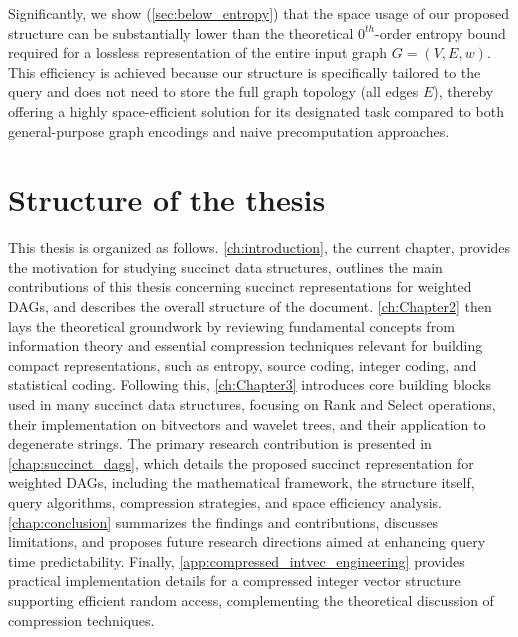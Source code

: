 Significantly, we show (\autoref{sec:below_entropy}) that the space usage of our proposed structure can be substantially lower than the theoretical $0^{th}$-order entropy bound required for a lossless representation of the entire input graph $G=(V, E, w)$. This efficiency is achieved because our structure is specifically tailored to the \Rank{} query and does not need to store the full graph topology (all edges $E$), thereby offering a highly space-efficient solution for its designated task compared to both general-purpose graph encodings and naive precomputation approaches.

\section{Structure of the thesis}
\label{sec:structure}

This thesis is organized as follows. \autoref{ch:introduction}, the current chapter, provides the motivation for studying succinct data structures, outlines the main contributions of this thesis concerning succinct representations for weighted DAGs, and describes the overall structure of the document. \autoref{ch:Chapter2} then lays the theoretical groundwork by reviewing fundamental concepts from information theory and essential compression techniques relevant for building compact representations, such as entropy, source coding, integer coding, and statistical coding. Following this, \autoref{ch:Chapter3} introduces core building blocks used in many succinct data structures, focusing on Rank and Select operations, their implementation on bitvectors and wavelet trees, and their application to degenerate strings. The primary research contribution is presented in \autoref{chap:succinct_dags}, which details the proposed succinct representation for weighted DAGs, including the mathematical framework, the structure itself, query algorithms, compression strategies, and space efficiency analysis. \autoref{chap:conclusion} summarizes the findings and contributions, discusses limitations, and proposes future research directions aimed at enhancing query time predictability. Finally, \autoref{app:compressed_intvec_engineering} provides practical implementation details for a compressed integer vector structure supporting efficient random access, complementing the theoretical discussion of compression techniques.
